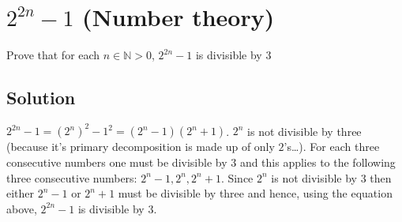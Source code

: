 \section{$2^{2n}-1$ (Number theory)}
Prove that for each $n\in \mathbb{N}>0$, $2^{2n}-1$ is divisible by 3

\subsection{Solution}
$2^{2n}-1=(2^{n})^2-1^2=(2^n-1)(2^n+1)$.
$2^n$ is not divisible by three (because it's primary decomposition is made up of only $2$'s\ldots).
For each three consecutive numbers one must be divisible by $3$ and this applies to the following
three consecutive numbers: $2^n-1,2^n,2^n+1$. Since $2^n$ is not divisible by $3$ then either
$2^n-1$ or $2^n+1$ must be divisible by three and hence, using the equation above, $2^{2n}-1$ is
divisible by $3$.
